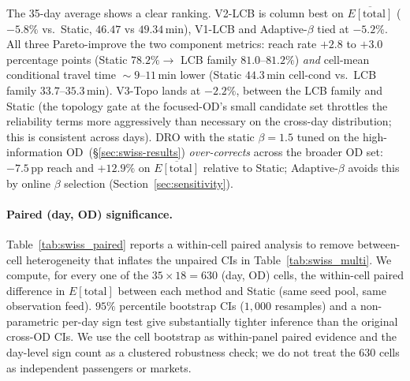 \documentclass[opre,dblanonrev]{informs4}
\begin{document}
The 35-day average shows a clear ranking. V2-LCB is column best on
$\overline{E[\mathrm{total}]}$ ($-5.8\%$ vs.\ Static, $46.47$ vs
$49.34$\,min), V1-LCB and Adaptive-$\beta$ tied at $-5.2\%$.
All three Pareto-improve the two component metrics: reach rate
$+2.8$ to $+3.0$ percentage points (Static $78.2\%\!\to\!$ LCB family
$81.0$--$81.2\%$) \emph{and} cell-mean conditional travel time
$\!\sim\!9$--$11$\,min lower (Static $44.3$\,min cell-cond vs.\ LCB family
$33.7$--$35.3$\,min). V3-Topo lands at $-2.2\%$, between the LCB
family and Static (the topology gate at the focused-OD's small
candidate set throttles the reliability terms more aggressively
than necessary on the cross-day distribution; this is consistent
across days). DRO with the static $\beta=1.5$ tuned on the
high-information OD~(\S\ref{sec:swiss-results}) \emph{over-corrects}
across the broader OD set: $-7.5$\,pp reach and $+12.9\%$ on
$\overline{E[\mathrm{total}]}$ relative to Static; Adaptive-$\beta$
avoids this by online $\beta$ selection
(Section~\ref{sec:sensitivity}).

\paragraph{Paired (day, OD) significance.} Table~\ref{tab:swiss_paired}
reports a within-cell paired analysis to remove
between-cell heterogeneity that inflates the unpaired CIs in
Table~\ref{tab:swiss_multi}. We compute, for every one of the
$35\times 18 = 630$ (day, OD) cells, the within-cell paired
difference in $E[\mathrm{total}]$ between each method and Static (same
seed pool, same observation feed). $95\%$ percentile bootstrap CIs
($1{,}000$ resamples) and a non-parametric per-day sign test give
substantially tighter inference than the original cross-OD CIs. We
use the cell bootstrap as within-panel paired evidence and the
day-level sign count as a clustered robustness check; we do not treat
the $630$ cells as independent passengers or markets.
\end{document}
